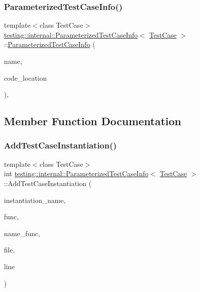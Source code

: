 \subsubsection{\texorpdfstring{ParameterizedTestCaseInfo()}{ParameterizedTestCaseInfo()}}
{\footnotesize\ttfamily template$<$class Test\+Case$>$ \\
\mbox{\hyperlink{classtesting_1_1internal_1_1_parameterized_test_case_info}{testing\+::internal\+::\+Parameterized\+Test\+Case\+Info}}$<$ \mbox{\hyperlink{classtesting_1_1_test_case}{Test\+Case}} $>$\+::\mbox{\hyperlink{classtesting_1_1internal_1_1_parameterized_test_case_info}{Parameterized\+Test\+Case\+Info}} (\begin{DoxyParamCaption}\item[{const char $\ast$}]{name,  }\item[{\mbox{\hyperlink{structtesting_1_1internal_1_1_code_location}{Code\+Location}}}]{code\+\_\+location }\end{DoxyParamCaption})\hspace{0.3cm}{\ttfamily [inline]}, {\ttfamily [explicit]}}



\subsection{Member Function Documentation}
\mbox{\label{classtesting_1_1internal_1_1_parameterized_test_case_info_adefded091e3f20ac3a758029caea3eab}} 
\subsubsection{\texorpdfstring{AddTestCaseInstantiation()}{AddTestCaseInstantiation()}}
{\footnotesize\ttfamily template$<$class Test\+Case$>$ \\
int \mbox{\hyperlink{classtesting_1_1internal_1_1_parameterized_test_case_info}{testing\+::internal\+::\+Parameterized\+Test\+Case\+Info}}$<$ \mbox{\hyperlink{classtesting_1_1_test_case}{Test\+Case}} $>$\+::Add\+Test\+Case\+Instantiation (\begin{DoxyParamCaption}\item[{const std\+::string \&}]{instantiation\+\_\+name,  }\item[{Generator\+Creation\+Func $\ast$}]{func,  }\item[{\mbox{\hyperlink{classtesting_1_1internal_1_1_parameterized_test_case_info_aed6c5184cb8f94cec73e9d7c4b7fa2ce}{Param\+Name\+Generator\+Func}} $\ast$}]{name\+\_\+func,  }\item[{const char $\ast$}]{file,  }\item[{int}]{line }\end{DoxyParamCaption})\hspace{0.3cm}{\ttfamily [inline]}}

